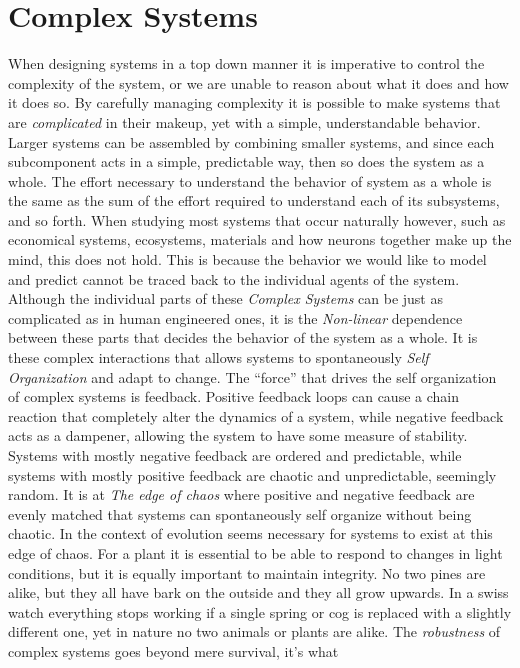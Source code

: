 \section{Complex Systems}
When designing systems in a top down manner it is imperative to control the
complexity of the system, or we are unable to reason about what it does and how
it does so.
By carefully managing complexity it is possible to make systems that are
\emph{complicated} in their makeup, yet with a simple, understandable behavior.
Larger systems can be assembled by combining smaller systems, and since each
subcomponent acts in a simple, predictable way, then so does the system as a
whole.
The effort necessary to understand the behavior of system as a whole is the same
as the sum of the effort required to understand each of its subsystems, and so
forth.
%
When studying most systems that occur naturally however, such as economical
systems, ecosystems, materials and how neurons together make up the mind, this
does not hold.
%
This is because the behavior we would like to model and predict cannot be traced
back to the individual agents of the system.
%
Although the individual parts of these \emph{Complex Systems} can be just as
complicated as in human engineered ones, it is the \emph{Non-linear} dependence
between these parts that decides the behavior of the system as a whole.
%
It is these complex interactions that allows systems to spontaneously \emph{Self
  Organization} and adapt to change.
%
The ``force'' that drives the self organization of complex systems is feedback.
Positive feedback loops can cause a chain reaction that completely alter the
dynamics of a system, while negative feedback acts as a dampener, allowing the
system to have some measure of stability.
Systems with mostly negative feedback are ordered and predictable, while systems
with mostly positive feedback are chaotic and unpredictable, seemingly random.
It is at \emph{The edge of chaos} where positive and negative feedback are
evenly matched that systems can spontaneously self organize without being chaotic.
%
In the context of evolution seems necessary for systems to exist at this edge of
chaos.
For a plant it is essential to be able to respond to changes in light
conditions, but it is equally important to maintain integrity.
No two pines are alike, but they all have bark on the outside and they all grow
upwards.
In a swiss watch everything stops working if a single spring or cog is replaced
with a slightly different one, yet in nature no two animals or plants are alike.
The \emph{robustness} of complex systems goes beyond mere survival, it's what
